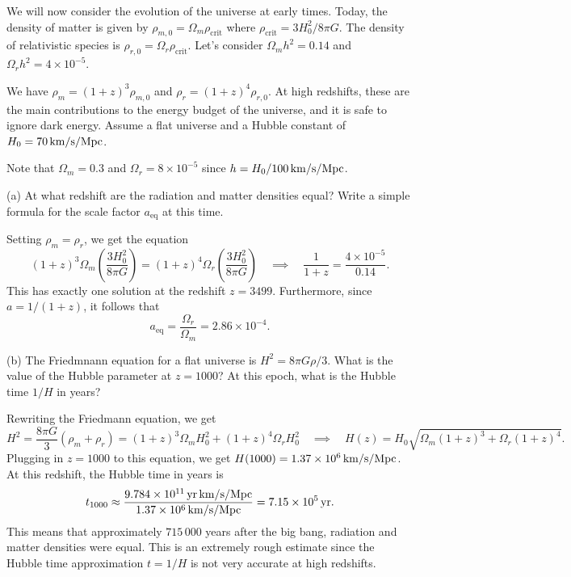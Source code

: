 \documentclass{lkx_pset}
\begin{document}
\begin{problem}{2}
We will now consider the evolution of the universe at early times. Today, the density of matter is given by $\rho_{m,0}=\Omega_m \rho_{\textrm{crit}}$ where $\rho_{\textrm{crit}}=3H_0^2/8\pi G$. The density of relativistic species is $\rho_{r,0}=\Omega_r \rho_{\textrm{crit}}$.
Let's consider $\Omega_m h^2 = 0.14$ and $\Omega_r h^2 = 4\times 10^{-5}$.
\end{problem}
\begin{parts}
	\begin{part}{}
		We have $\rho_m=(1+z)^3\rho_{m,0}$ and $\rho_r= (1+z)^4\rho_{r,0}$. At high redshifts, these are the main contributions to the energy budget of the universe, and it is safe to ignore dark energy. Assume a flat universe and a Hubble constant of $H_0=\Hsi{70}$.
	\end{part}
	Note that $\Omega_m= 0.3$ and $\Omega_r = 8\times 10^{-5}$ since $h = H_0/\Hsi{100}$.

	\begin{part}{(a)}
		At what redshift are the radiation and matter densities equal? Write a simple formula for the scale factor $a_{\textrm{eq}}$ at this time.
	\end{part}
	Setting $\rho_m = \rho_r$, we get the equation
	\[
		(1+z)^3 \Omega_m \left(\frac{3H_0^2}{8\pi G}\right)
		=
		(1+z)^4 \Omega_r \left(\frac{3H_0^2}{8\pi G}\right)
		\quad\implies\quad \frac{1}{1+z} = \frac{4\times 10^{-5}}{0.14}.
	\]
	This has exactly one solution at the redshift $z=3499$. Furthermore, since $a=1/(1+z)$, it follows that
	\[
		a_{\textrm{eq}} = \frac{\Omega_r}{\Omega_m} = 2.86\times 10^{-4}.
	\]

	\begin{part}{(b)}
		The Friedmnann equation for a flat universe is $H^2=8\pi G\rho/3$. What is the value of the Hubble parameter at $z=1000$? At this epoch, what is the Hubble time $1/H$ in years?
	\end{part}
	Rewriting the Friedmann equation, we get
	\[
		H^2 = \frac{8\pi G}{3}\left(\rho_m + \rho_r\right) = (1+z)^3 \Omega_m H_0^2 + (1+z)^4 \Omega_r H_0^2\quad\implies\quad H(z)=H_0\sqrt{\Omega_m(1+z)^3+\Omega_r(1+z)^4}.
	\]
	Plugging in $z=1000$ to this equation, we get $H(1000) = \Hsi{1.37e6}$. At this redshift, the Hubble time in years is
	\[
		t_{1000} \approx \frac{\Hyrsi{9.784e11}}{\Hsi{1.37e6}} = \yrsi{7.15e5}.
	\]
	This means that approximately $715\,000$ years after the big bang, radiation and matter densities were equal. This is an extremely rough estimate since the Hubble time approximation $t=1/H$ is not very accurate at high redshifts.


\end{parts}
\end{document}
